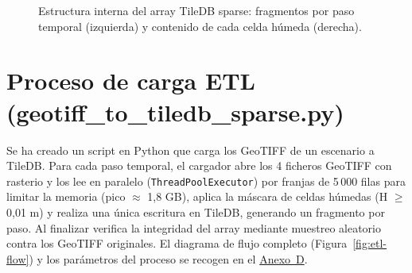 \begin{figure}[ht]
\caption{Estructura interna del array TileDB sparse: fragmentos por paso temporal (izquierda) y contenido de cada celda húmeda (derecha).}
\label{fig:tiledb-estructura}
\end{figure}

\FloatBarrier
\section{Proceso de carga ETL (geotiff\_to\_tiledb\_sparse.py)}\label{proceso-de-carga-etl-geotiff_to_tiledb_sparse.py}

Se ha creado un script en Python que carga los GeoTIFF de un escenario a TileDB. Para cada paso temporal, el cargador abre los 4 ficheros GeoTIFF con rasterio y los lee en paralelo (\texttt{ThreadPoolExecutor}) por franjas de 5\,000 filas para limitar la memoria (pico $\approx$ 1,8 GB), aplica la máscara de celdas húmedas (H $\geq$ 0,01 m) y realiza una única escritura en TileDB, generando un fragmento por paso. Al finalizar verifica la integridad del array mediante muestreo aleatorio contra los GeoTIFF originales. El diagrama de flujo completo (Figura~\ref{fig:etl-flow}) y los parámetros del proceso se recogen en el \hyperref[anexo-d.-proceso-de-ingesta-etl-detallado]{Anexo~D}.

